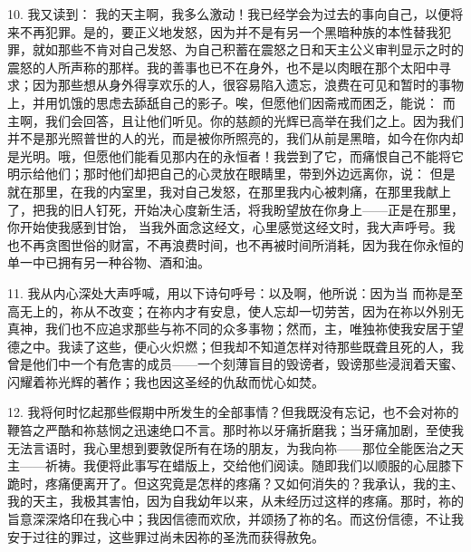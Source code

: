 10. 我又读到： 我的天主啊，我多么激动！我已经学会为过去的事向自己，以便将来不再犯罪。是的，要正义地发怒，因为并不是有另一个黑暗种族的本性替我犯罪，就如那些不肯对自己发怒、为自己积蓄在震怒之日和天主公义审判显示之时的震怒的人所声称的那样。我的善事也已不在身外，也不是以肉眼在那个太阳中寻求；因为那些想从身外得享欢乐的人，很容易陷入遗忘，浪费在可见和暂时的事物上，并用饥饿的思虑去舔舐自己的影子。唉，但愿他们因斋戒而困乏，能说： 而主啊，我们会回答，且让他们听见。你的慈颜的光辉已高举在我们之上。因为我们并不是那光照普世的人的光，而是被你所照亮的，我们从前是黑暗，如今在你内却是光明。哦，但愿他们能看见那内在的永恒者！我尝到了它，而痛恨自己不能将它明示给他们；那时他们却把自己的心灵放在眼睛里，带到外边远离你，说： 但是就在那里，在我的内室里，我对自己发怒，在那里我内心被刺痛，在那里我献上了，把我的旧人钉死，开始决心度新生活，将我盼望放在你身上——正是在那里，你开始使我感到甘饴， 当我外面念这经文，心里感觉这经文时，我大声呼号。我也不再贪图世俗的财富，不再浪费时间，也不再被时间所消耗，因为我在你永恒的单一中已拥有另一种谷物、酒和油。\par

11. 我从内心深处大声呼喊，用以下诗句呼号：以及啊，他所说：因为当   而祢是至高无上的，祢从不改变；在祢内才有安息，使人忘却一切劳苦，因为在祢以外别无真神，我们也不应追求那些与祢不同的众多事物；然而，主，唯独祢使我安居于望德之中。我读了这些，便心火炽燃；但我却不知道怎样对待那些既聋且死的人，我曾是他们中一个有危害的成员——一个刻薄盲目的毁谤者，毁谤那些浸润着天蜜、闪耀着祢光辉的著作；我也因这圣经的仇敌而忧心如焚。\par

12. 我将何时忆起那些假期中所发生的全部事情？但我既没有忘记，也不会对祢的鞭笞之严酷和祢慈悯之迅速绝口不言。那时祢以牙痛折磨我；当牙痛加剧，至使我无法言语时，我心里想到要敦促所有在场的朋友，为我向祢——那位全能医治之天主——祈祷。我便将此事写在蜡版上，交给他们阅读。随即我们以顺服的心屈膝下跪时，疼痛便离开了。但这究竟是怎样的疼痛？又如何消失的？我承认，我的主、我的天主，我极其害怕，因为自我幼年以来，从未经历过这样的疼痛。那时，祢的旨意深深烙印在我心中；我因信德而欢欣，并颂扬了祢的名。而这份信德，不让我安于过往的罪过，这些罪过尚未因祢的圣洗而获得赦免。\par

